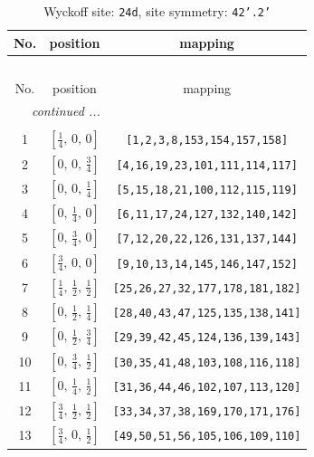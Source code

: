 \documentclass[fleqn,8pt]{jsarticle}
\begin{document}
\begin{longtable}{ccc}
\caption{Wyckoff site: {\tt 24d}, site symmetry: {\tt 42'.2'}}
 \\
 \hline \hline
No. & position & mapping \\ \hline \endfirsthead

\multicolumn{2}{l}{\tablename\ \thetable{}} \\
 \hline \hline
No. & position & mapping \\ \hline \endhead

 \hline \hline
\multicolumn{2}{r}{\footnotesize\it continued ...} \\ \endfoot

 \hline \hline
\multicolumn{2}{r}{} \\ \endlastfoot

1 & $\left[ \frac{1}{4},\, 0,\, 0 \right]$ & {\tt [1,2,3,8,153,154,157,158]} \\ \hline
2 & $\left[ 0,\, 0,\, \frac{3}{4} \right]$ & {\tt [4,16,19,23,101,111,114,117]} \\ \hline
3 & $\left[ 0,\, 0,\, \frac{1}{4} \right]$ & {\tt [5,15,18,21,100,112,115,119]} \\ \hline
4 & $\left[ 0,\, \frac{1}{4},\, 0 \right]$ & {\tt [6,11,17,24,127,132,140,142]} \\ \hline
5 & $\left[ 0,\, \frac{3}{4},\, 0 \right]$ & {\tt [7,12,20,22,126,131,137,144]} \\ \hline
6 & $\left[ \frac{3}{4},\, 0,\, 0 \right]$ & {\tt [9,10,13,14,145,146,147,152]} \\ \hline
7 & $\left[ \frac{1}{4},\, \frac{1}{2},\, \frac{1}{2} \right]$ & {\tt [25,26,27,32,177,178,181,182]} \\ \hline
8 & $\left[ 0,\, \frac{1}{2},\, \frac{1}{4} \right]$ & {\tt [28,40,43,47,125,135,138,141]} \\ \hline
9 & $\left[ 0,\, \frac{1}{2},\, \frac{3}{4} \right]$ & {\tt [29,39,42,45,124,136,139,143]} \\ \hline
10 & $\left[ 0,\, \frac{3}{4},\, \frac{1}{2} \right]$ & {\tt [30,35,41,48,103,108,116,118]} \\ \hline
11 & $\left[ 0,\, \frac{1}{4},\, \frac{1}{2} \right]$ & {\tt [31,36,44,46,102,107,113,120]} \\ \hline
12 & $\left[ \frac{3}{4},\, \frac{1}{2},\, \frac{1}{2} \right]$ & {\tt [33,34,37,38,169,170,171,176]} \\ \hline
13 & $\left[ \frac{3}{4},\, 0,\, \frac{1}{2} \right]$ & {\tt [49,50,51,56,105,106,109,110]} \\ \hline

\end{longtable}
\end{document}
